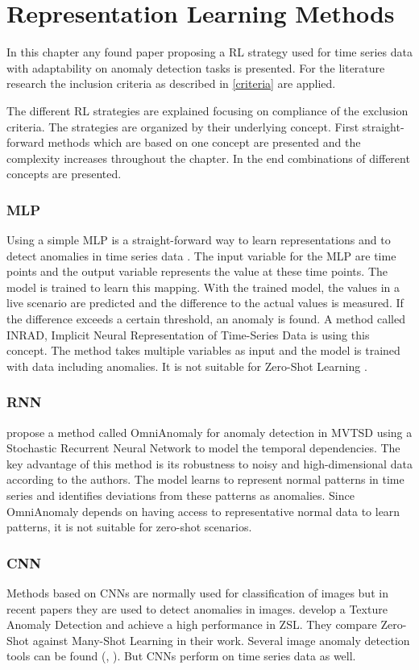 \section{Representation Learning Methods}\label{review}
In this chapter any found paper proposing a RL strategy used for time series data with adaptability on anomaly detection tasks is presented. For the literature research the inclusion criteria as described in \autoref{criteria} are applied.

The different RL strategies are explained focusing on compliance of the exclusion criteria. The strategies are organized by their underlying concept. First straight-forward methods which are based on one concept are presented and the complexity increases throughout the chapter. In the end combinations of different concepts are presented.
\subsubsection{MLP}
Using a simple MLP is a straight-forward way to learn representations and to detect anomalies in time series data \cite{nielsen_neural_2015}. The input variable for the MLP are time points and the output variable represents the value at these time points. The model is trained to learn this mapping. With the trained model, the values in a live scenario are predicted and the difference to the actual values is measured. If the difference exceeds a certain threshold, an anomaly is found. A method called INRAD, Implicit Neural Representation of Time-Series Data is using this concept. The method takes multiple variables as input and the model is trained with data including anomalies. It is not suitable for Zero-Shot Learning \cite{jeong_time-series_2022}.
\subsubsection{RNN}
\cite{su_robust_2019} propose a method called OmniAnomaly for anomaly detection in MVTSD using a Stochastic Recurrent Neural Network to model the temporal dependencies.
The key advantage of this method is its robustness to noisy and high-dimensional data according to the authors. The model learns to represent normal patterns in time series and identifies deviations from these patterns as anomalies. Since OmniAnomaly depends on having access to representative normal data to learn patterns, it is not suitable for zero-shot scenarios.
\subsubsection{CNN}
Methods based on CNNs are normally used for classification of images but in recent papers they are used to detect anomalies in images. \cite{aota_zero-shot_2023} develop a Texture Anomaly Detection and achieve a high performance in ZSL. They compare Zero-Shot against Many-Shot Learning in their work. Several image anomaly detection tools can be found (\cite{sabokrou_deep-anomaly__2018}, \cite{aota_zero-shot_2023}). But CNNs perform on time series data as well.

